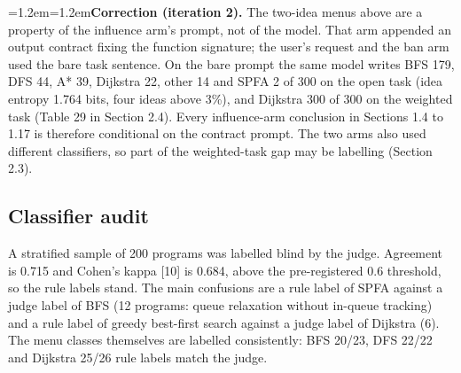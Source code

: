 \documentclass[11pt,letterpaper]{article}
\newenvironment{correction}{\par\medskip\noindent\begin{minipage}{\linewidth}\small\leftskip=1.2em\rightskip=1.2em\noindent}{\end{minipage}\par\medskip}
\begin{document}
\begin{correction}\textbf{Correction (iteration 2).} The two-idea menus above are a property of the influence arm's prompt, not of the model. That arm appended an output contract fixing the function signature; the user's request and the ban arm used the bare task sentence. On the bare prompt the same model writes BFS 179, DFS 44, A* 39, Dijkstra 22, other 14 and SPFA 2 of 300 on the open task (idea entropy 1.764 bits, four ideas above 3\%), and Dijkstra 300 of 300 on the weighted task (Table 29 in Section 2.4). Every influence-arm conclusion in Sections 1.4 to 1.17 is therefore conditional on the contract prompt. The two arms also used different classifiers, so part of the weighted-task gap may be labelling (Section 2.3).\end{correction}
\subsection{Classifier audit}
A stratified sample of 200 programs was labelled blind by the judge. Agreement is 0.715 and Cohen's kappa [10] is 0.684, above the pre-registered 0.6 threshold, so the rule labels stand. The main confusions are a rule label of SPFA against a judge label of BFS (12 programs: queue relaxation without in-queue tracking) and a rule label of greedy best-first search against a judge label of Dijkstra (6). The menu classes themselves are labelled consistently: BFS 20/23, DFS 22/22 and Dijkstra 25/26 rule labels match the judge.
\end{document}
